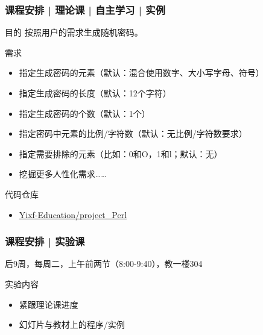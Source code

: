 \begin{frame}
  \frametitle{课程安排 | 理论课 | 自主学习 | 实例}
  \begin{block}{目的}
    按照用户的需求生成随机密码。
  \end{block}
  \pause
  \begin{block}{需求}
    \begin{itemize}
      \item 指定生成密码的元素（默认：混合使用数字、大小写字母、符号）
      \item 指定生成密码的长度（默认：12个字符）
      \item 指定生成密码的个数（默认：1个）
      \item 指定密码中元素的比例/字符数（默认：无比例/字符数要求）
      \item 指定需要排除的元素（比如：0和O，1和l；默认：无）
      \item 挖掘更多人性化需求……
    \end{itemize}
  \end{block}
  \pause
  \begin{block}{代码仓库}
    \begin{itemize}
      \item \href{https://github.com/Yixf-Education/project_Perl}{Yixf-Education/project\_Perl}
    \end{itemize}
  \end{block}
\end{frame}

\begin{frame}
  \frametitle{课程安排 | 实验课}
  \begin{center}
  \alert{后9周，每周二，上午前两节（8:00-9:40），教一楼304}\\
  \vspace{0.2cm}
  \end{center}
  \begin{block}{实验内容}
    \begin{itemize}
      \item 紧跟理论课进度
      \item 幻灯片与教材上的程序/实例
    \end{itemize}
  \end{block}
\end{frame}


